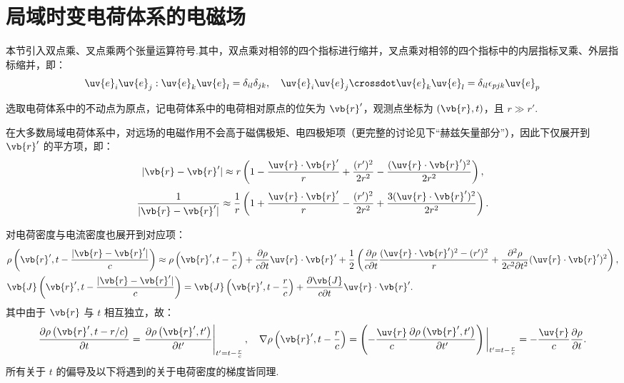 \section{局域时变电荷体系的电磁场}

本节引入双点乘、叉点乘两个张量运算符号.其中，双点乘对相邻的四个指标进行缩并，叉点乘对相邻的四个指标中的内层指标叉乘、外层指标缩并，即：
\begin{align*}
	\uv{e}_i \uv{e}_j : \uv{e}_k \uv{e}_l = \delta_{il} \delta_{jk}, \quad
	\uv{e}_i \uv{e}_j \crossdot \uv{e}_k \uv{e}_l = \delta_{il} \epsilon_{pjk} \uv{e}_p
\end{align*}

选取电荷体系中的不动点为原点，记电荷体系中的电荷相对原点的位矢为 \(\vb{r}'\)，观测点坐标为 \((\vb{r}, t)\)，且 \(r \gg r'\).

在大多数局域电荷体系中，对远场的电磁作用不会高于磁偶极矩、电四极矩项（更完整的讨论见下“赫兹矢量部分”），因此下仅展开到 \(\vb{r}'\) 的平方项，即：
\begin{align*}
	|\vb{r} - \vb{r}'| \approx r \left( 1 - \frac{\uv{r} \cdot \vb{r}'}{r} + \frac{(r')^2}{2r^2} - \frac{(\uv{r} \cdot \vb{r}')^2}{2r^2} \right),
\end{align*}
\begin{align*}
	\frac{1}{|\vb{r} - \vb{r}'|} \approx \frac{1}{r} \left( 1 + \frac{\uv{r} \cdot \vb{r}'}{r} - \frac{(r')^2}{2r^2} + \frac{3(\uv{r} \cdot \vb{r}')^2}{2r^2} \right).
\end{align*}

对电荷密度与电流密度也展开到对应项：
\begin{align*}
	&\rho\left( \vb{r}', t - \frac{|\vb{r} - \vb{r}'|}{c} \right) \approx \rho\left( \vb{r}', t - \frac{r}{c} \right) + \frac{\partial \rho}{c \partial t} \uv{r} \cdot \vb{r}' + \frac{1}{2} \left( \frac{\partial \rho}{c \partial t} \frac{(\uv{r} \cdot \vb{r}')^2 - (r')^2}{r} + \frac{\partial^2 \rho}{2c^2 \partial t^2} (\uv{r} \cdot \vb{r}')^2 \right),\\
	&\vb{J}\left( \vb{r}', t - \frac{|\vb{r} - \vb{r}'|}{c} \right) = \vb{J}\left( \vb{r}', t - \frac{r}{c} \right) + \frac{\partial \vb{J}}{c \partial t} \uv{r} \cdot \vb{r}'.
\end{align*}
其中由于 \(\vb{r}\) 与 \(t\) 相互独立，故：
\begin{align*}
	\frac{\partial \rho\left( \vb{r}', t - r/c  \right)}{\partial t} = \left. \frac{\partial \rho\left( \vb{r}', t' \right)}{\partial t'} \right|_{t' = t - \frac{r}{c}}, \quad
	\nabla \rho\left( \vb{r}', t - \frac{r}{c} \right) = \left( -\frac{\uv{r}}{c} \frac{\partial \rho\left( \vb{r}', t' \right)}{\partial t'} \right) \bigg|_{t' = t - \frac{r}{c}} = -\frac{\uv{r}}{c} \frac{\partial \rho}{\partial t}.
\end{align*}
所有关于 \(t\) 的偏导及以下将遇到的关于电荷密度的梯度皆同理.

